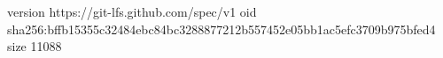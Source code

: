 version https://git-lfs.github.com/spec/v1
oid sha256:bffb15355c32484ebc84bc3288877212b557452e05bb1ac5efc3709b975bfed4
size 11088
